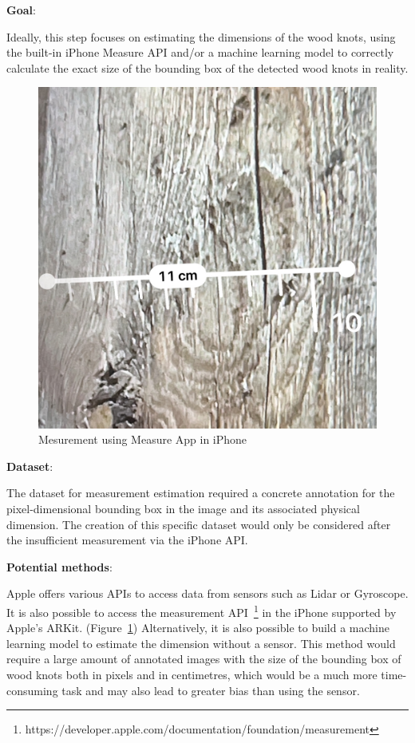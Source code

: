 \renewcommand\thesection{\arabic{section}}
\renewcommand\thesubsection{\thesection.\arabic{subsection}}


\textbf{Goal}:

Ideally, this step focuses on estimating the dimensions of the wood knots, using the built-in iPhone Measure API and/or a machine learning model to correctly calculate the exact size of the bounding box of the detected wood knots in reality. 


\begin{figure}[ht]
  \centering
   \includegraphics[width=.5\textwidth]{Master Thesis/Images/Section_3/3_iphone_measure.jpg}
  \caption{Mesurement using Measure App in iPhone}   
  \label{fig:iphone_mea}
\end{figure}  

\hspace*{\fill}

\textbf{Dataset}:

The dataset for measurement estimation required a concrete annotation for the pixel-dimensional bounding box in the image and its associated physical dimension. The creation of this specific dataset would only be considered after the insufficient measurement via the iPhone API.

\hspace*{\fill}

\textbf{Potential methods}:

Apple offers various APIs to access data from sensors such as Lidar or Gyroscope. It is also possible to access the measurement API~\footnote{https://developer.apple.com/documentation/foundation/measurement} in the iPhone supported by Apple's ARKit. (Figure~\ref{fig:iphone_mea}) Alternatively, it is also possible to build a machine learning model to estimate the dimension without a sensor. This method would require a large amount of annotated images with the size of the bounding box of wood knots both in pixels and in centimetres, which would be a much more time-consuming task and may also lead to greater bias than using the sensor. 



